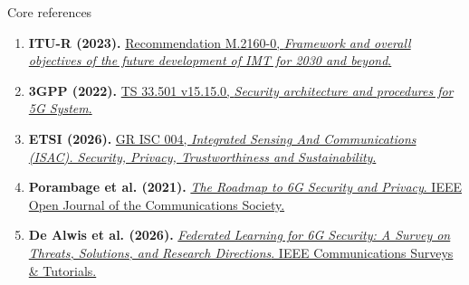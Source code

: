 \documentclass[aspectratio=169,11pt]{beamer}
\begin{document}
\begin{frame}[t]{Core references}
\vspace{.27cm}
\small
\begin{enumerate}
\setlength{\itemsep}{.25cm}
\item \textbf{ITU-R (2023).} \href{https://www.itu.int/rec/R-REC-M.2160-0-202311-I/en}{Recommendation M.2160-0, \emph{Framework and overall objectives of the future development of IMT for 2030 and beyond}.}
\item \textbf{3GPP (2022).} \href{https://www.etsi.org/deliver/etsi_ts/133500_133599/133501/15.15.00_60/ts_133501v151500p.pdf}{TS 33.501 v15.15.0, \emph{Security architecture and procedures for 5G System}.}
\item \textbf{ETSI (2026).} \href{https://www.etsi.org/deliver/etsi_gr/ISC/001_099/004/01.01.01_60/gr_isc004v010101p.pdf}{GR ISC 004, \emph{Integrated Sensing And Communications (ISAC). Security, Privacy, Trustworthiness and Sustainability}.}
\item \textbf{Porambage et al. (2021).} \href{https://doi.org/10.1109/OJCOMS.2021.3078081}{\emph{The Roadmap to 6G Security and Privacy}. IEEE Open Journal of the Communications Society.}
\item \textbf{De Alwis et al. (2026).} \href{https://doi.org/10.1109/COMST.2026.3663434}{\emph{Federated Learning for 6G Security: A Survey on Threats, Solutions, and Research Directions}. IEEE Communications Surveys \& Tutorials.}
\end{enumerate}
\end{frame}
\end{document}
